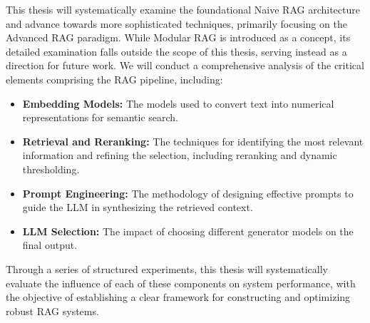This thesis will systematically examine the foundational Naive RAG architecture and advance towards more sophisticated techniques, primarily focusing on the Advanced RAG paradigm. While Modular RAG is introduced as a concept, its detailed examination falls outside the scope of this thesis, serving instead as a direction for future work. We will conduct a comprehensive analysis of the critical elements comprising the RAG pipeline, including:
\begin{itemize}
    \item \textbf{Embedding Models:} The models used to convert text into numerical representations for semantic search.
    \item \textbf{Retrieval and Reranking:} The techniques for identifying the most relevant information and refining the selection, including reranking and dynamic thresholding.
    \item \textbf{Prompt Engineering:} The methodology of designing effective prompts to guide the LLM in synthesizing the retrieved context.
    \item \textbf{LLM Selection:} The impact of choosing different generator models on the final output.
\end{itemize}

Through a series of structured experiments, this thesis will systematically evaluate the influence of each of these components on system performance, with the objective of establishing a clear framework for constructing and optimizing robust RAG systems.
